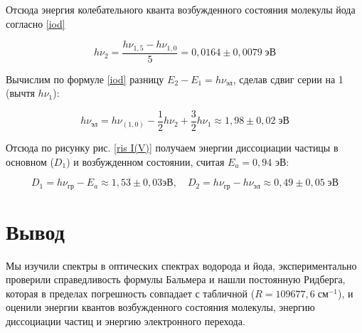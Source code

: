 \documentclass[12pt]{kiarticle}
\begin{document}
	Отсюда энергия колебательного кванта возбужденного состояния молекулы йода согласно \eqref{iod}
	
	\begin{equation}\label{}
	h\nu_2 = \dfrac{h\nu_{1, 5} - h\nu_{1, 0}}{5} = 0,0164 \pm 0,0079 \; эВ
	\end{equation}
	
	Вычислим по формуле \eqref{iod} разницу $ E_2 - E_1 = h\nu_{эл}$, сделав сдвиг серии на 1 (вычтя $ h\nu_1 $):
	
	\begin{equation}\label{}
	h \nu_{эл} = h \nu_(1,0) - \dfrac{1}{2} h\nu_2 + \dfrac{3}{2}h\nu_1 \approx 1,98  \pm 0,02 \; эВ
	\end{equation}
	
	Отсюда по рисунку рис. \ref{ris I(V)} получаем энергии диссоциации частицы в основном ($ D_1 $) и возбужденном состоянии, считая $ E_a = 0,94 $ эВ:
	
	\begin{equation}\label{}
	D_1 = h \nu_{гр} - E_a \approx 1,53 \pm 0,03 эВ, \quad D_2 = h \nu_{гр} - h \nu_{эл} \approx 0,49 \pm 0,05 \; эВ
	\end{equation}
	
	\section{Вывод }
	
	Мы изучили спектры в оптических спектрах водорода и йода, экспериментально проверили справедливость формулы Бальмера и нашли постоянную Ридберга, которая в пределах погрешность совпадает с табличной ($ R = 109 677,6 \; см^{-1} $), и оценили энергии квантов возбужденного состояния молекулы, энергию диссоциации частиц и энергию электронного перехода.
	
\end{document}
